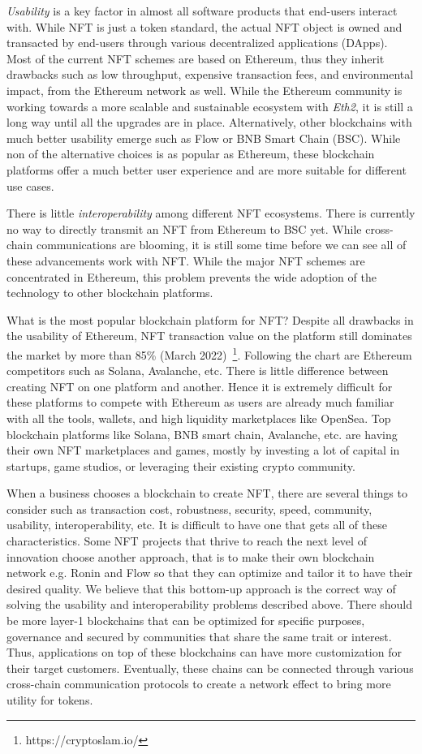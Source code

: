 \documentclass[11pt, titlepage]{article}
\begin{document}
\emph{Usability} is a key factor in almost all software products that end-users interact with. While NFT is just a token standard, the actual NFT object is owned and transacted by end-users through various decentralized applications (DApps). Most of the current NFT schemes are based on Ethereum, thus they inherit drawbacks such as low throughput, expensive transaction fees, and environmental impact, from the Ethereum network as well. While the Ethereum community is working towards a more scalable and sustainable ecosystem with \emph{Eth2}, it is still a long way until all the upgrades are in place. Alternatively, other blockchains with much better usability emerge such as Flow or BNB Smart Chain (BSC). While non of the alternative choices is as popular as Ethereum, these blockchain platforms offer a much better user experience and are more suitable for different use cases. 

There is little \emph{interoperability} among different NFT ecosystems. There is currently no way to directly transmit an NFT from Ethereum to BSC yet. While cross-chain communications are blooming, it is still some time before we can see all of these advancements work with NFT. While the major NFT schemes are concentrated in Ethereum, this problem prevents the wide adoption of the technology to other blockchain platforms.

What is the most popular blockchain platform for NFT? Despite all drawbacks in the usability of Ethereum, NFT transaction value on the platform still dominates the market by more than 85\% (March 2022)~\footnote{https://cryptoslam.io/}. Following the chart are Ethereum competitors such as Solana, Avalanche, etc. There is little difference between creating NFT on one platform and another. Hence it is extremely difficult for these platforms to compete with Ethereum as users are already much familiar with all the tools, wallets, and high liquidity marketplaces like OpenSea. Top blockchain platforms like Solana, BNB smart chain, Avalanche, etc. are having their own NFT marketplaces and games, mostly by investing a lot of capital in startups, game studios, or leveraging their existing crypto community.

When a business chooses a blockchain to create NFT, there are several things to consider such as transaction cost, robustness, security, speed, community, usability, interoperability, etc. It is difficult to have one that gets all of these characteristics. Some NFT projects that thrive to reach the next level of innovation choose another approach, that is to make their own blockchain network e.g. Ronin and Flow so that they can optimize and tailor it to have their desired quality. We believe that this bottom-up approach is the correct way of solving the usability and interoperability problems described above. There should be more layer-1 blockchains that can be optimized for specific purposes, governance and secured by communities that share the same trait or interest. Thus, applications on top of these blockchains can have more customization for their target customers. Eventually, these chains can be connected through various cross-chain communication protocols to create a network effect to bring more utility for tokens.
\end{document}
